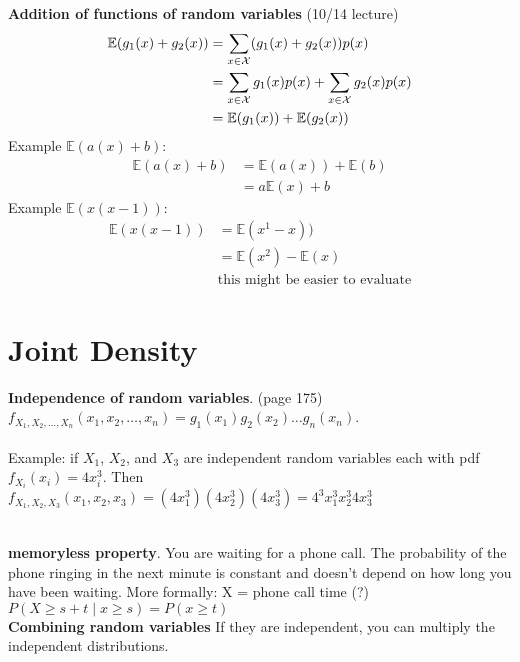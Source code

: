 \textbf{Addition of functions of random variables} 
{ \tiny (10/14 lecture)}
	\begin{align*}
		\mathbb{E} (g_1(x) + g_2(x)) &=   \sum\limits_{x \in {\cal X}} (g_1(x) + g_2(x))p(x) \\
			&= \sum\limits_{x \in {\cal X}} g_1(x)p(x) + \sum\limits_{x \in {\cal X}} g_2(x)p(x) \\
			&=\mathbb{E}  (g_1(x)) + \mathbb{E} (g_2(x)) \\
	\end{align*} 
Example $\mathbb{E}  (a(x) + b)$:
	\begin{align*}
		\mathbb{E} (a(x) + b) &=  \mathbb{E}  (a(x)) + \mathbb{E} (b) \\
			& = a\mathbb{E} (x) + b
	\end{align*} 
Example $\mathbb{E}  (x(x-1))$:
	\begin{align*}
		\mathbb{E} (x(x-1)) &= \mathbb{E} (x^1 - x)) \\
			& =  \mathbb{E}  (x^2) - \mathbb{E} (x)    \\
			& \mbox{this might be easier to evaluate}
	\end{align*} 
	
\section{Joint Density}

\textbf{Independence of random variables}.  {\tiny (page 175)} \hfill \\
$f_{X_1, X_2 , \dots, X_n}(x_1, x_2 , \dots, x_n) = g_1(x_1) g_2(x_2) \dots g_n(x_n)$. \hfill \\
\hfill \\
Example: if $X_1$, $X_2$, and $X_3$ are independent random variables each with pdf $f_{X_i}(x_i) = 4x_i^3$. 
Then $f_{X_1, X_2, X_3}(x_1, x_2, x_3) = (4x_1^3)(4x_2^3)(4x_3^3) = 4^3 x_1^3 x_2^3 4x_3^3$

\hfill \\

\textbf{memoryless property}.  You are waiting for a phone call.  The probability of the phone ringing in the next minute is constant and doesn't depend on how long you have been waiting.  More formally: X = phone call time (?)   \hfill \\
$P(X \geq s + t \mid x \geq s) = P(x \geq t) $ \hfill \\
$ $  \hfill \\

\textbf{Combining random variables}
If they are independent, you can multiply the independent distributions. 


